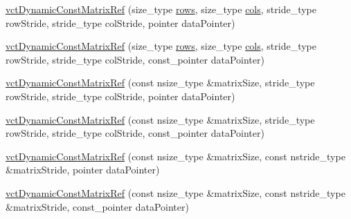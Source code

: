 \begin{DoxyCompactItemize}
\item 
\hyperlink{classvct_dynamic_const_matrix_ref_aad4b16cf2deb8b7c35610c7ec32dbb9b}{vct\-Dynamic\-Const\-Matrix\-Ref} (size\-\_\-type \hyperlink{classvct_dynamic_const_matrix_base_a5eac13be2207ebeb8766cde379d73438}{rows}, size\-\_\-type \hyperlink{classvct_dynamic_const_matrix_base_aa6c51d41a100da49a7e7ac7edb20ecd9}{cols}, stride\-\_\-type row\-Stride, stride\-\_\-type col\-Stride, pointer data\-Pointer)
\item 
\hyperlink{classvct_dynamic_const_matrix_ref_a7cc35b9428843e85624f1bce7098c89b}{vct\-Dynamic\-Const\-Matrix\-Ref} (size\-\_\-type \hyperlink{classvct_dynamic_const_matrix_base_a5eac13be2207ebeb8766cde379d73438}{rows}, size\-\_\-type \hyperlink{classvct_dynamic_const_matrix_base_aa6c51d41a100da49a7e7ac7edb20ecd9}{cols}, stride\-\_\-type row\-Stride, stride\-\_\-type col\-Stride, const\-\_\-pointer data\-Pointer)
\item 
\hyperlink{classvct_dynamic_const_matrix_ref_acc22ef717bf7922b0d2a21b27d21bd9a}{vct\-Dynamic\-Const\-Matrix\-Ref} (const nsize\-\_\-type \&matrix\-Size, stride\-\_\-type row\-Stride, stride\-\_\-type col\-Stride, pointer data\-Pointer)
\item 
\hyperlink{classvct_dynamic_const_matrix_ref_abc8c732c965cff7bd449bcdffd7932dc}{vct\-Dynamic\-Const\-Matrix\-Ref} (const nsize\-\_\-type \&matrix\-Size, stride\-\_\-type row\-Stride, stride\-\_\-type col\-Stride, const\-\_\-pointer data\-Pointer)
\item 
\hyperlink{classvct_dynamic_const_matrix_ref_ac09a3ad8850cfc2f747179cbd0e290ce}{vct\-Dynamic\-Const\-Matrix\-Ref} (const nsize\-\_\-type \&matrix\-Size, const nstride\-\_\-type \&matrix\-Stride, pointer data\-Pointer)
\item 
\hyperlink{classvct_dynamic_const_matrix_ref_aadff1c2bde72946b9daa305f7159e240}{vct\-Dynamic\-Const\-Matrix\-Ref} (const nsize\-\_\-type \&matrix\-Size, const nstride\-\_\-type \&matrix\-Stride, const\-\_\-pointer data\-Pointer)
\end{DoxyCompactItemize}

